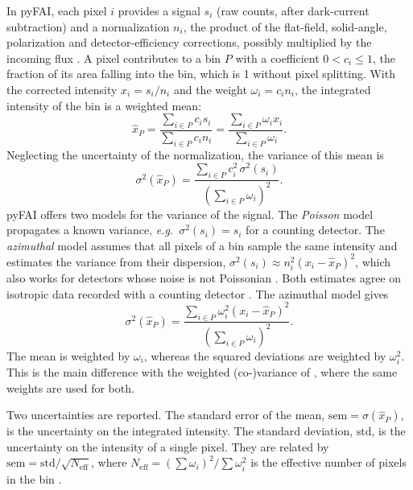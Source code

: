 \documentclass{iucrjournals}
\newcommand{\mean}[1]{\widehat{#1}}
\begin{document}
In pyFAI, each pixel $i$ provides a signal $s_i$ (raw counts, after dark-current subtraction) and a normalization $n_i$, the product of the flat-field, solid-angle, polarization and detector-efficiency corrections, possibly multiplied by the incoming flux \cite{Kieffer2020}.
A pixel contributes to a bin $P$ with a coefficient $0<c_i\le1$, the fraction of its area falling into the bin, which is 1 without pixel splitting.
With the corrected intensity $x_i = s_i/n_i$ and the weight $\omega_i = c_i n_i$, the integrated intensity of the bin is a weighted mean:
\begin{equation}
  \mean{x}_P = \frac{\sum_{i\in P} c_i s_i}{\sum_{i\in P} c_i n_i}
             = \frac{\sum_{i\in P}\omega_i x_i}{\sum_{i\in P}\omega_i}.
  \label{eq:mean-bin}
\end{equation}
Neglecting the uncertainty of the normalization, the variance of this mean is \cite{Kieffer2020,Kieffer2025}
\begin{equation}
  \sigma^2(\mean{x}_P) = \frac{\sum_{i\in P} c_i^2\,\sigma^2(s_i)}{\left(\sum_{i\in P}\omega_i\right)^2}.
  \label{eq:var-bin}
\end{equation}
pyFAI offers two models for the variance of the signal.
The \emph{Poisson} model propagates a known variance, \emph{e.g.}\ $\sigma^2(s_i)=s_i$ for a counting detector.
The \emph{azimuthal} model assumes that all pixels of a bin sample the same intensity and estimates the variance from their dispersion, $\sigma^2(s_i)\approx n_i^2(x_i-\mean{x}_P)^2$, which also works for detectors whose noise is not Poissonian \cite{Kieffer2025}.
Both estimates agree on isotropic data recorded with a counting detector \cite{Sedlak2017}.
The azimuthal model gives
\begin{equation}
  \sigma^2(\mean{x}_P) = \frac{\sum_{i\in P}\omega_i^2(x_i-\mean{x}_P)^2}{\left(\sum_{i\in P}\omega_i\right)^2}.
  \label{eq:sem-bin}
\end{equation}
The mean is weighted by $\omega_i$, whereas the squared deviations are weighted by $\omega_i^2$.
This is the main difference with the weighted (co-)variance of , where the same weights are used for both.

Two uncertainties are reported.
The standard error of the mean, $\mathrm{sem}=\sigma(\mean{x}_P)$, is the uncertainty on the integrated intensity.
The standard deviation, $\mathrm{std}$, is the uncertainty on the intensity of a single pixel.
They are related by $\mathrm{sem}=\mathrm{std}/\sqrt{N_\mathrm{eff}}$, where $N_\mathrm{eff}=\left(\sum\omega_i\right)^2/\sum\omega_i^2$ is the effective number of pixels in the bin \cite{Kieffer2025}.
\end{document}
